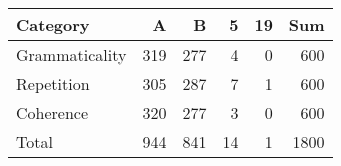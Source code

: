 \begin{tabular}{lrrrrr}
\toprule
Category & A & B & 5 & 19 & Sum \\
\midrule
Grammaticality & 319 & 277 & 4 & 0 & 600 \\
Repetition & 305 & 287 & 7 & 1 & 600 \\
Coherence & 320 & 277 & 3 & 0 & 600 \\
Total & 944 & 841 & 14 & 1 & 1800 \\
\bottomrule
\end{tabular}
